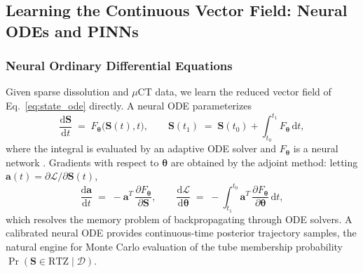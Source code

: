 \documentclass[11pt]{article}
\newcommand{\dd}{\mathrm{d}}
\newcommand{\RZT}{\mathrm{RTZ}}
\begin{document}
\subsection{Learning the Continuous Vector Field: Neural ODEs and PINNs}


\subsubsection{Neural Ordinary Differential Equations}
Given sparse dissolution and $\mu$CT data, we learn the reduced vector field of Eq.~\eqref{eq:state_ode} directly. A neural ODE parameterizes
\begin{equation}
\frac{\dd\mathbf{S}}{\dd t} \;=\; F_{\boldsymbol{\theta}}\bigl(\mathbf{S}(t),t\bigr),\qquad
\mathbf{S}(t_1)\;=\;\mathbf{S}(t_0)+\int_{t_0}^{t_1}F_{\boldsymbol{\theta}}\,\dd t,
\label{eq:node}
\end{equation}
where the integral is evaluated by an adaptive ODE solver and $F_{\boldsymbol{\theta}}$ is a neural network \cite{Chen2018}. Gradients with respect to $\boldsymbol{\theta}$ are obtained by the adjoint method: letting $\mathbf{a}(t)=\partial \mathcal{L}/\partial \mathbf{S}(t)$,
\begin{equation}
\frac{\dd\mathbf{a}}{\dd t} \;=\; -\mathbf{a}^{T}\,\frac{\partial F_{\boldsymbol{\theta}}}{\partial \mathbf{S}},\qquad
\frac{\dd \mathcal{L}}{\dd \boldsymbol{\theta}} \;=\; -\int_{t_1}^{t_0}\mathbf{a}^{T}\,\frac{\partial F_{\boldsymbol{\theta}}}{\partial \boldsymbol{\theta}}\,\dd t,
\label{eq:adjoint}
\end{equation}
which resolves the memory problem of backpropagating through ODE solvers. A calibrated neural ODE provides continuous-time posterior trajectory samples, the natural engine for Monte Carlo evaluation of the tube membership probability $\Pr(\mathbf{S}\in\RZT\mid\mathcal{D})$.
\end{document}
